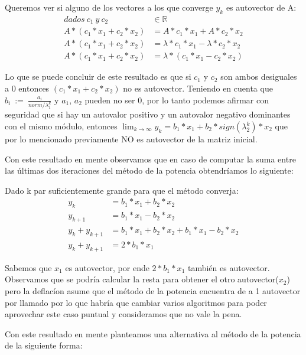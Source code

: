 \vspace{1em}

Queremos ver si alguno de los vectores a los que converge $y_k$ es autovector de A:
\begin{align}
    dados\ c_1 \ y \ c_2 &\in \mathbb{R} \\
    A * (c_1 * x_1 + c_2 * x_2) &= A * c_1 * x_1 + A * c_2 * x_2 \\
    A * (c_1 * x_1 + c_2 * x_2) &= \lambda * c_1 * x_1 - \lambda * c_2 * x_2 \\
    A * (c_1 * x_1 + c_2 * x_2) &= \lambda * (c_1 * x_1 - c_2 * x_2) 
\end{align}

Lo que se puede concluir de este resultado es que si $c_1$ y $c_2$ son ambos desiguales a 0 entonces $(c_1 * x_1 + c_2 * x_2)$ no es autovector. Teniendo en cuenta que $b_i \ := \ \frac{a_i}{norm / \lambda_{1}^{k}}$ y $a_1$, $a_2$ pueden no ser 0, por lo tanto podemos afirmar con seguridad que si hay un autovalor positivo y un autovalor negativo dominantes con el mismo módulo, entonces $\lim_{k \to \infty} y_k = b_1 * x_1 + b_2 * sign(\lambda_{2}^{k}) * x_2$ que por lo mencionado previamente NO es autovector de la matriz inicial.

\vspace{1em}

Con este resultado en mente observamos que en caso de computar la suma entre las últimas dos iteraciones del método de la potencia obtendríamos lo siguiente:

\vspace{1em}
Dado k par suficientemente grande para que el método converja: 
\begin{align}
    y_k &= b_1 * x_1 + b_2 * x_2 \\ 
    y_{k+1} &= b_1 * x_1 - b_2 * x_2 \\ 
    y_k + y_{k+1} &= b_1 * x_1 + b_2 * x_2 + b_1 * x_1 - b_2 * x_2 \\ 
    y_k + y_{k+1} &= 2 * b_1 * x_1
\end{align}

Sabemos que $x_1$ es autovector, por ende $2 * b_1 * x_1$ también es autovector.
Observamos que se podría calcular la resta para obtener el otro autovector($x_2$) pero la deflacíon asume que el método de la potencia encuentra de a 1 autovector por llamado por lo que habría que cambiar varios algoritmos para poder aprovechar este caso puntual y consideramos que no vale la pena.

\vspace{1em}
Con este resultado en mente planteamos una alternativa al método de la potencia de la siguiente forma:


